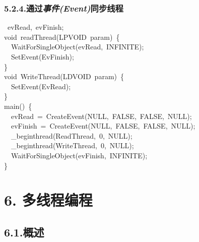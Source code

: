 \documentclass{article}
\begin{document}
\subsubsection{5.2.4.\hspace*{0.5em}通过\emph{事件(Event)}同步线程}\label{sec--event-}%
\begin{mdpre}%
~evRead,~evFinish;\\
{void}~readThread({LPVOID}~param)~\{\\
~~{WaitForSingleObject}(evRead,~{INFINITE});\\
~~{SetEvent}({EvFinish});\\
\}\\
{void}~{WriteThread}({LDVOID}~param)~\{\\
~~{SetEvent}({EvRead});\\
\}\\
main()~\{\\
~~evRead~=~{CreateEvent}({NULL},~{FALSE},~{FALSE},~{NULL});\\
~~evFinish~=~{CreateEvent}({NULL},~{FALSE},~{FALSE},~{NULL});\\
~~\_beginthread({ReadThread},~{0},~{NULL});\\
~~\_beginthread({WriteThread},~{0},~{NULL});\\
~~{WaitForSingleObject}(evFinish,~{INFINITE});\\
\}%
\end{mdpre}
\section{6.\hspace*{0.5em} 多线程编程}\label{sec-openmp-}%

\subsection{6.1.\hspace*{0.5em}概述}\label{section}%
\end{document}
